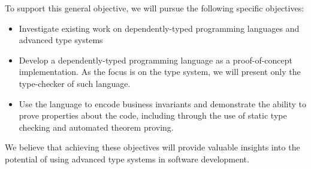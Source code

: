 To support this general objective, we will pursue the following specific objectives:

\begin{itemize}
\item Investigate existing work on dependently-typed programming languages and advanced type systems
\item Develop a dependently-typed programming language as a proof-of-concept implementation. As the focus is on the type system, we will present only the type-checker of such language.
\item Use the language to encode business invariants and demonstrate the ability to prove properties about the code, including through the use of static type checking and automated theorem proving.
\end{itemize}

We believe that achieving these objectives will provide valuable insights into the potential of using advanced type systems in software development.
